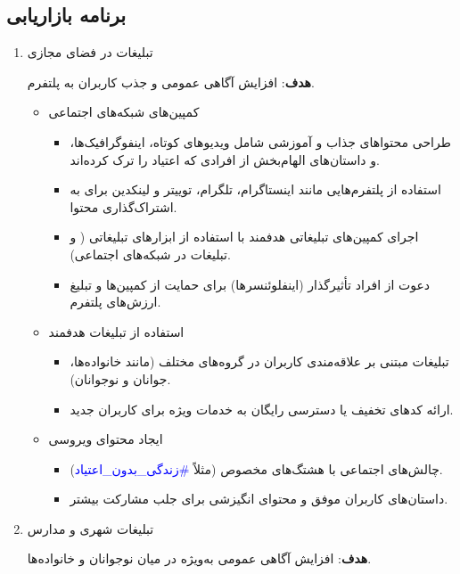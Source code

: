 \documentclass[dvipsnames, svgnames, x11names, 11pt]{article}
\begin{document}
\subsection{برنامه بازاریابی}
\begin{enumerate}
\item 
تبلیغات در فضای مجازی 
 
\textbf{هدف}:
افزایش آگاهی عمومی و جذب کاربران به پلتفرم.  
\begin{itemize}
\item 
کمپین‌های شبکه‌های اجتماعی
\begin{itemize}
\item 
طراحی محتواهای جذاب و آموزشی شامل ویدیوهای کوتاه، اینفوگرافیک‌ها، و داستان‌های الهام‌بخش از افرادی که اعتیاد را ترک کرده‌اند.  

\item 
استفاده از پلتفرم‌هایی مانند اینستاگرام، تلگرام، توییتر و لینکدین برای به اشتراک‌گذاری محتوا.  

\item 
اجرای کمپین‌های تبلیغاتی هدفمند با استفاده از ابزارهای تبلیغاتی ( و تبلیغات در شبکه‌های اجتماعی).  

\item 
دعوت از افراد تأثیرگذار (اینفلوئنسرها) برای حمایت از کمپین‌ها و تبلیغ ارزش‌های پلتفرم.  
\end{itemize}

\item 
استفاده از تبلیغات هدفمند
\begin{itemize}
\item 
تبلیغات مبتنی بر علاقه‌مندی کاربران در گروه‌های مختلف (مانند خانواده‌ها، جوانان و نوجوانان).  

\item 
ارائه کدهای تخفیف یا دسترسی رایگان به خدمات ویژه برای کاربران جدید.  
\end{itemize}
\item 
ایجاد محتوای ویروسی
\begin{itemize}
\item 
چالش‌های اجتماعی با هشتگ‌های مخصوص (مثلاً 
\textcolor{blue}{\#زندگی\_بدون\_اعتیاد}).  
\item 
داستان‌های کاربران موفق و محتوای انگیزشی برای جلب مشارکت بیشتر.  
\end{itemize}
\end{itemize}

\item 
تبلیغات شهری و مدارس 
 
\textbf{هدف}:
افزایش آگاهی عمومی به‌ویژه در میان نوجوانان و خانواده‌ها.  


\end{enumerate}
\end{document}
